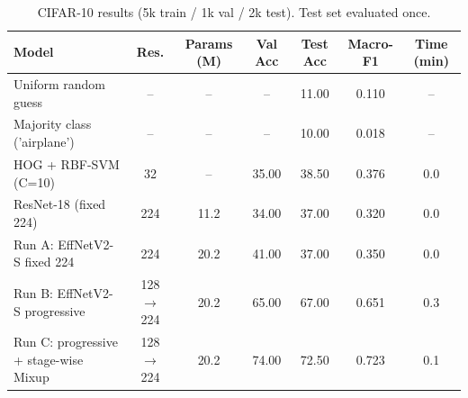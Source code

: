 \begin{table}[t]
\centering\small
\caption{CIFAR-10 results (5k train / 1k val / 2k test). Test set evaluated once.}
\label{tab:main}
\begin{tabular}{lcccccc}
\toprule
Model & Res. & Params (M) & Val Acc & Test Acc & Macro-F1 & Time (min) \\
\midrule
Uniform random guess & – & – & – & 11.00 & 0.110 & – \\
Majority class ('airplane') & – & – & – & 10.00 & 0.018 & – \\
HOG + RBF-SVM (C=10) & 32 & – & 35.00 & 38.50 & 0.376 & 0.0 \\
ResNet-18 (fixed 224) & 224 & 11.2 & 34.00 & 37.00 & 0.320 & 0.0 \\
Run A: EffNetV2-S fixed 224 & 224 & 20.2 & 41.00 & 37.00 & 0.350 & 0.0 \\
Run B: EffNetV2-S progressive & 128$\to$224 & 20.2 & 65.00 & 67.00 & 0.651 & 0.3 \\
Run C: progressive + stage-wise Mixup & 128$\to$224 & 20.2 & 74.00 & 72.50 & 0.723 & 0.1 \\
\bottomrule
\end{tabular}
\end{table}
